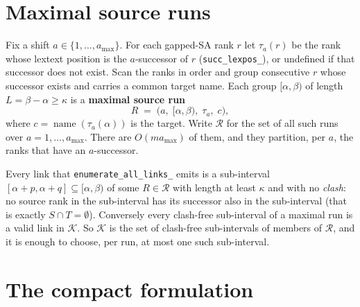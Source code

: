 \documentclass[11pt,a4paper]{article}
\theoremstyle{definition}
\theoremstyle{plain}
\theoremstyle{remark}
\newcommand{\name}{\operatorname{name}}
\newcommand{\Links}{\mathcal{K}}
\newcommand{\Runs}{\mathcal{R}}
\begin{document}
\section{Maximal source runs}
\label{sec:runs}

Fix a shift $a \in \{1,\dots,a_{\max}\}$. For each gapped-SA rank $r$ let
$\tau_a(r)$ be the rank whose lextext position is the $a$-successor of
$r$ (\texttt{succ\_lexpos\_}), or undefined if that successor does not
exist. Scan the ranks in order and group consecutive $r$ whose successor
exists and carries a common target name. Each group
$[ \alpha, \beta )$ of length $L = \beta - \alpha \ge \kappa$ is a
\textbf{maximal source run}
\[
  R \;=\; \bigl( a,\; [\alpha,\beta),\; \tau_a,\; c \bigr),
\]
where $c = \name(\tau_a(\alpha))$ is the target. Write $\Runs$ for the
set of all such runs over $a = 1,\dots,a_{\max}$. There are
$O(m a_{\max})$ of them, and they partition, per $a$, the ranks that
have an $a$-successor.

Every link that \texttt{enumerate\_all\_links\_} emits is a sub-interval
$[\alpha+p, \alpha+q] \subseteq [\alpha,\beta)$ of some $R \in \Runs$
with length at least $\kappa$ and with no \emph{clash}: no source rank
in the sub-interval has its successor also in the sub-interval (that is
exactly $S \cap T = \emptyset$). Conversely every clash-free sub-interval
of a maximal run is a valid link in $\Links$. So $\Links$ is the set of
clash-free sub-intervals of members of $\Runs$, and it is enough to
choose, per run, at most one such sub-interval.

\section{The compact formulation}
\label{sec:compact}
\end{document}
